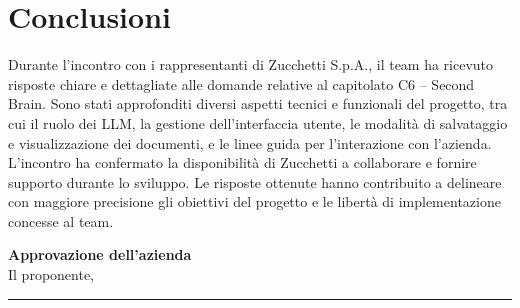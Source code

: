 \documentclass[a4paper,12pt]{article}
\begin{document}
\section{Conclusioni}{
  Durante l’incontro con i rappresentanti di Zucchetti S.p.A., il team ha ricevuto risposte chiare e dettagliate alle domande relative al capitolato C6 – Second Brain.
  Sono stati approfonditi diversi aspetti tecnici e funzionali del progetto, tra cui il ruolo dei LLM, la gestione dell’interfaccia utente, le modalità di salvataggio e visualizzazione dei documenti, e le linee guida per l’interazione con l’azienda.
  L’incontro ha confermato la disponibilità di Zucchetti a collaborare e fornire supporto durante lo sviluppo. Le risposte ottenute hanno contribuito a delineare con maggiore precisione gli obiettivi del progetto e le libertà di implementazione concesse al team.
}

\vspace{2cm}
\begin{flushright}
    \textbf{Approvazione dell'azienda} \\
    Il proponente,\\[0.5cm]
    \rule{6cm}{0.4pt}\\
\end{flushright}
\end{document}
